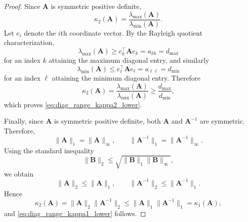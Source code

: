\documentclass[11pt,a4paper]{article}
\theoremstyle{plain}
\theoremstyle{definition}
\theoremstyle{remark}
\begin{document}
\begin{proof}
Since $\mathbf{A}$ is symmetric positive definite,
\begin{equation*}
\kappa_2(\mathbf{A})=\frac{\lambda_{\max}(\mathbf{A})}{\lambda_{\min}(\mathbf{A})}.
\end{equation*}
Let $e_i$ denote the $i$th coordinate vector. By the Rayleigh quotient characterization,
\begin{equation*}
\lambda_{\max}(\mathbf{A})\ge e_k^\top \mathbf{A} e_k = a_{kk}=d_{\max}
\end{equation*}
for an index $k$ attaining the maximum diagonal entry, and similarly
\begin{equation*}
\lambda_{\min}(\mathbf{A})\le e_\ell^\top \mathbf{A} e_\ell = a_{\ell\ell}=d_{\min}
\end{equation*}
for an index $\ell$ attaining the minimum diagonal entry. Therefore
\begin{equation*}
\kappa_2(\mathbf{A})
=
\frac{\lambda_{\max}(\mathbf{A})}{\lambda_{\min}(\mathbf{A})}
\ge
\frac{d_{\max}}{d_{\min}},
\end{equation*}
which proves \eqref{eq:diag_range_kappa2_lower}.

Finally, since $\mathbf A$ is symmetric positive definite, both $\mathbf A$ and $\mathbf A^{-1}$ are symmetric. Therefore,
\[
\|\mathbf A\|_1=\|\mathbf A\|_\infty,
\qquad
\|\mathbf A^{-1}\|_1=\|\mathbf A^{-1}\|_\infty.
\]
Using the standard inequality
\[
\|\mathbf B\|_2\le \sqrt{\|\mathbf B\|_1\|\mathbf B\|_\infty},
\]
we obtain
\[
\|\mathbf A\|_2\le \|\mathbf A\|_1,
\qquad
\|\mathbf A^{-1}\|_2\le \|\mathbf A^{-1}\|_1.
\]
Hence
\begin{equation*}
\kappa_2(\mathbf{A})
=
\|\mathbf{A}\|_2\|\mathbf{A}^{-1}\|_2
\le
\|\mathbf{A}\|_1\|\mathbf{A}^{-1}\|_1
=
\kappa_1(\mathbf{A}),
\end{equation*}
and \eqref{eq:diag_range_kappa1_lower} follows.
\end{proof}
\end{document}

